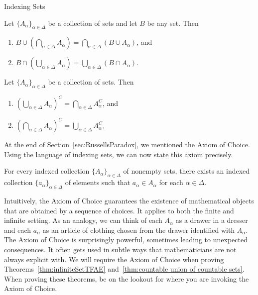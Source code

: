 \begin{section}{Indexing Sets}


\begin{theorem}
Let $\{A_{\alpha}\}_{\alpha\in\Delta}$ be a collection of sets and let $B$ be any set.  Then
\begin{enumerate}[label=\textrm{(\alph*)}]
\item $\displaystyle B \cup \left(\bigcap_{\alpha\in\Delta}A_{\alpha}\right)=\bigcap_{\alpha\in\Delta}(B\cup A_{\alpha})$, and
\item $\displaystyle B \cap \left(\bigcup_{\alpha\in\Delta}A_{\alpha}\right)=\bigcup_{\alpha\in\Delta}(B\cap A_{\alpha})$.
\end{enumerate}
\end{theorem}

\begin{theorem}
Let $\{A_{\alpha}\}_{\alpha\in\Delta}$ be a collection of sets.  Then
\begin{enumerate}[label=\textrm{(\alph*)}]
\item $\displaystyle \left(\bigcup_{\alpha\in\Delta} A_{\alpha}\right)^C=\bigcap_{\alpha\in\Delta}A_{\alpha}^{C}$, and
\item $\displaystyle \left(\bigcap_{\alpha\in\Delta} A_{\alpha}\right)^C=\bigcup_{\alpha\in\Delta}A_{\alpha}^{C}$.
\end{enumerate}
\end{theorem}

At the end of Section~\ref{sec:RussellsParadox}, we mentioned the Axiom of Choice.  Using the language of indexing sets, we can now state this axiom precisely.

\begin{axiom}
For every indexed collection $\{A_{\alpha}\}_{\alpha\in\Delta}$ of nonempty sets, there exists an indexed collection $\{a_{\alpha}\}_{\alpha\in\Delta}$ of elements such that $a_{\alpha}\in A_{\alpha}$ for each $\alpha\in \Delta$.
\end{axiom}

Intuitively, the Axiom of Choice guarantees the existence of mathematical objects that are obtained by a sequence of choices. It applies to both the finite and infinite setting. As an analogy, we can think of each $A_{\alpha}$ as a drawer in a dresser and each $a_{\alpha}$ as an article of clothing chosen from the drawer identified with $A_{\alpha}$. The Axiom of Choice is surprisingly powerful, sometimes leading to unexpected consequences. It often gets used in subtle ways that mathematicians are not always explicit with.  We will require the Axiom of Choice when proving Theorems~\ref{thm:infiniteSetTFAE} and~\ref{thm:countable union of countable sets}. When proving these theorems, be on the lookout for where you are invoking the Axiom of Choice.


\end{section}

